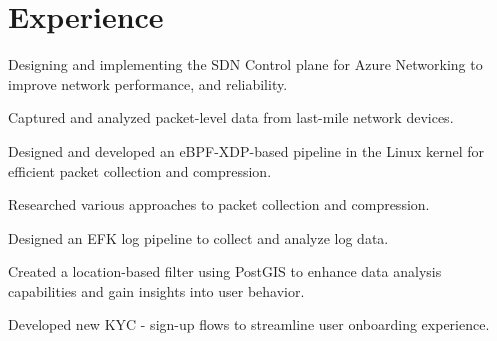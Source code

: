 \documentclass[letterpaper]{deedy-resume} %
\begin{document}
\begin{minipage}[t]{0.66\textwidth} %


\section{Experience}


\vspace{\topsep} %
\begin{tightitemize}
\item Designing and implementing the SDN Control plane for Azure Networking to improve network performance, and reliability.
\end{tightitemize}

\sectionspace %

\begin{tightitemize}
\item Captured and analyzed packet-level data from last-mile network devices.
\item Designed and developed an eBPF-XDP-based pipeline in the Linux kernel for efficient packet collection and compression.
\item Researched various approaches to packet collection and compression.
\end{tightitemize}

\sectionspace %


\begin{tightitemize}
\item Designed an EFK log pipeline to collect and analyze log data.
\item Created a location-based filter using PostGIS to enhance data analysis capabilities and gain insights into user behavior.
\item Developed new KYC - sign-up flows to streamline user onboarding experience.
\end{tightitemize}


\end{minipage}
\end{document}
